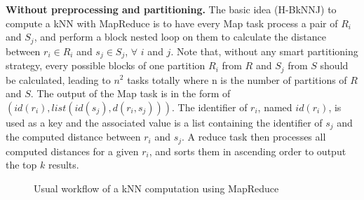 \textbf{Without preprocessing and partitioning.} 
The basic idea (H-BkNNJ) to compute a kNN with MapReduce is to have every Map task process a 
pair of $R_i$ and $S_j$, and perform a block nested loop on them to calculate the distance between $r_i \in 
R_i$ and $s_j \in S_j$,  $\forall$ $i$ and $j$. Note that, without any smart partitioning strategy, every possible blocks of one partition $R_i$ from $R$ and $S_j$ from $S$ should be calculated, leading to $n^2$ tasks totally where n is the number of partitions of $R$ and $S$.
The output of the Map task is in the form of $\left(id(r_i), list
\left( id(s_{j}), d\left(r_i, s_j\right)\right)\right)$. The identifier of $r_i$, named $id(r_i)$, is used as a key and the 
associated value is a list containing the identifier of $s_j$ and the computed distance between $r_i$ and $s_j$. A reduce task then 
processes all computed distances for a given $r_i$, and sorts them in ascending order to 
output the top $k$ results. 
\begin{figure}[t]
\center
{}
\caption{Usual workflow of a kNN computation using MapReduce \label{workflow}}
\end{figure}


